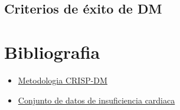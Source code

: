 \documentclass[12pt, letterpaper, spanish]{article}
\begin{document}
\subsection{Criterios de éxito de DM}
\section{Bibliografia}
\begin{itemize}
    \item \href{https://www.sngular.com/es/crisp-dm-fase-i-comprension-del-negocio/?authuser=0}
    {Metodologia CRISP-DM}
    \item \href{https://www.datos.gov.py/search/type/dataset}
    {Conjunto de datos de insuficiencia cardiaca}
\end{itemize}
\end{document}
